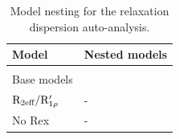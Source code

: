 \latex{\begin{landscape}}
\begin{center}
\begin{small}

\latex{\LTcapwidth=\textwidth}
\begin{longtable}{ll}

\caption{Model nesting for the relaxation dispersion auto-analysis.}

\\
\toprule
Model & Nested models\footnotemark[1] \\
\midrule
\endhead

\bottomrule
\endfoot

\label{table: dispersion model nesting}


\\[-5pt]
Base models \\
\cline{1-1}
$\mathrm{R}_{\textrm{2eff}}/\mathrm{R}_{1\rho}'$         & - \\
No Rex                           & - \\


\end{longtable}
\end{small}
\end{center}
